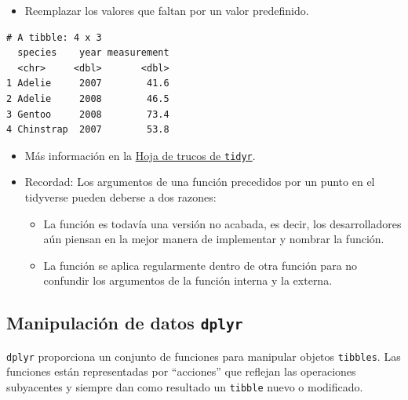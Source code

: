 \documentclass[
  letterpaper,
  DIV=11,
  numbers=noendperiod]{scrreprt}
\newenvironment{Shaded}{\begin{snugshade}}{\end{snugshade}}
\newcommand{\AttributeTok}[1]{\textcolor[rgb]{0.40,0.45,0.13}{#1}}
\newcommand{\FunctionTok}[1]{\textcolor[rgb]{0.28,0.35,0.67}{#1}}
\newcommand{\NormalTok}[1]{\textcolor[rgb]{0.00,0.23,0.31}{#1}}
\newcommand{\SpecialCharTok}[1]{\textcolor[rgb]{0.37,0.37,0.37}{#1}}
\providecommand{\tightlist}{%
  \setlength{\itemsep}{0pt}\setlength{\parskip}{0pt}}\usepackage{longtable,booktabs,array}
\begin{document}
\begin{itemize}
\tightlist
\item
  Reemplazar los valores que faltan por un valor predefinido.
\end{itemize}

\begin{Shaded}
\end{Shaded}

\begin{verbatim}
# A tibble: 4 x 3
  species    year measurement
  <chr>     <dbl>       <dbl>
1 Adelie     2007        41.6
2 Adelie     2008        46.5
3 Gentoo     2008        73.4
4 Chinstrap  2007        53.8
\end{verbatim}

\begin{itemize}
\item
  Más información en la
  \href{https://raw.githubusercontent.com/rstudio/cheatsheets/master/data-import.pdf}{Hoja
  de trucos de \texttt{tidyr}}.
\item
  {Recordad}: Los argumentos de una función precedidos por un punto en
  el tidyverse pueden deberse a dos razones:

  \begin{itemize}
  \item
    La función es todavía una versión no acabada, es decir, los
    desarrolladores aún piensan en la mejor manera de implementar y
    nombrar la función.
  \item
    La función se aplica regularmente dentro de otra función para no
    confundir los argumentos de la función interna y la externa.
  \end{itemize}
\end{itemize}

\subsection{\texorpdfstring{Manipulación de datos
\texttt{dplyr}}{Manipulación de datos dplyr}}\label{manipulaciuxf3n-de-datos-dplyr}

\texttt{dplyr} proporciona un conjunto de funciones para manipular
objetos \texttt{tibbles}. Las funciones están representadas por
``acciones'' que reflejan las operaciones subyacentes y siempre dan como
resultado un \texttt{tibble} nuevo o modificado.
\end{document}
